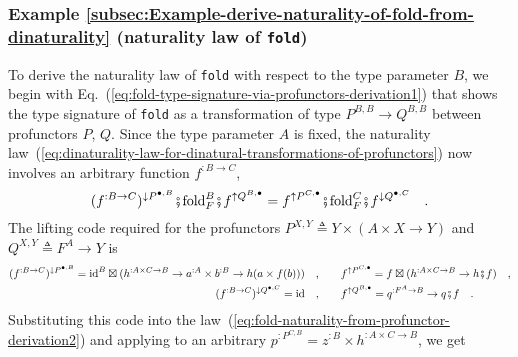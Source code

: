 \subsubsection{Example \label{subsec:Example-derive-naturality-of-fold-from-dinaturality}\ref{subsec:Example-derive-naturality-of-fold-from-dinaturality}
(naturality law of \lstinline!fold!)}

To derive the naturality law of \lstinline!fold! with respect to
the type parameter $B$, we begin with Eq.~(\ref{eq:fold-type-signature-via-profunctors-derivation1})
that shows the type signature of \lstinline!fold! as a transformation
of type $P^{B,B}\rightarrow Q^{B,B}$ between profunctors $P$, $Q$.
Since the type parameter $A$ is fixed, the naturality law~(\ref{eq:dinaturality-law-for-dinatural-transformations-of-profunctors})
now involves an arbitrary function $f^{:B\rightarrow C}$,
\begin{equation}
(f^{:B\rightarrow C})^{\downarrow P^{\bullet,B}}\bef\text{fold}_{F}^{B}\bef f^{\uparrow Q^{B,\bullet}}=f^{\uparrow P^{C,\bullet}}\bef\text{fold}_{F}^{C}\bef f^{\downarrow Q^{\bullet,C}}\quad.\label{eq:fold-naturality-from-profunctor-derivation2}
\end{equation}
The lifting code required for the profunctors $P^{X,Y}\triangleq Y\times\left(A\times X\rightarrow Y\right)$
and $Q^{X,Y}\triangleq F^{A}\rightarrow Y$ is
\begin{align*}
(f^{:B\rightarrow C})^{\downarrow P^{\bullet,B}}=\text{id}^{B}\boxtimes(h^{:A\times C\rightarrow B}\rightarrow a^{:A}\times b^{:B}\rightarrow h(a\times f(b)))\quad, & \quad\quad f^{\uparrow P^{C,\bullet}}=f\boxtimes(h^{:A\times C\rightarrow B}\rightarrow h\bef f)\quad,\\
(f^{:B\rightarrow C})^{\downarrow Q^{\bullet,C}}=\text{id}\quad, & \quad\quad f^{\uparrow Q^{B,\bullet}}=q^{:F^{A}\rightarrow B}\rightarrow q\bef f\quad.
\end{align*}
Substituting this code into the law~(\ref{eq:fold-naturality-from-profunctor-derivation2})
and applying to an arbitrary $p^{:P^{C,B}}=z^{:B}\times h^{:A\times C\rightarrow B}$,
we get
